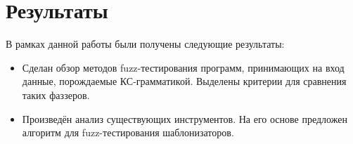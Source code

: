 \documentclass[a4paper]{article}
\begin{document}
\newpage
\section{Результаты}
\indent

В рамках данной работы были получены следующие результаты:
\begin{itemize}
    \item Сделан обзор методов fuzz-тестирования программ, принимающих на вход данные, порождаемые КС-грамматикой. Выделены критерии для сравнения таких фаззеров.
    \item Произведён анализ существующих инструментов. На его основе предложен алгоритм для fuzz-тестирования шаблонизаторов.
\end{itemize}

\newpage
\end{document}
